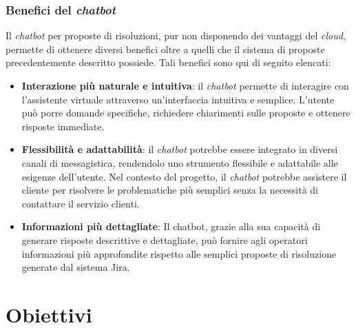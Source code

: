 \subsubsection{Benefici del \textit{chatbot}}
Il \textit{chatbot} per proposte di risoluzioni,  pur non disponendo dei vantaggi del \textit{cloud}, permette di ottenere diversi benefici oltre a quelli che il sistema di proposte precedentemente descritto possiede. Tali benefici sono qui di seguito elencati:
\begin{itemize}
    \item \textbf{Interazione più naturale e intuitiva}: il \textit{chatbot} permette di interagire con l'assistente virtuale attraverso un'interfaccia intuitiva e semplice. L'utente può porre domande specifiche, richiedere chiarimenti sulle proposte e ottenere risposte immediate.
    \item \textbf{Flessibilità e adattabilità}: il \textit{chatbot} potrebbe essere integrato in diversi canali di messagistica, rendendolo uno strumento flessibile e adattabile alle esigenze dell'utente. Nel contesto del progetto, il \textit{chatbot} potrebbe assistere il cliente per risolvere le problematiche più semplici senza la necessità di contattare il servizio clienti.
    \item \textbf{Informazioni più dettagliate}: Il chatbot, grazie alla sua capacità di generare risposte descrittive e dettagliate, può fornire agli operatori informazioni più approfondite rispetto alle semplici proposte di risoluzione generate dal sistema Jira.
\end{itemize}

\section{Obiettivi} \label{sec:obiettiviStage}

